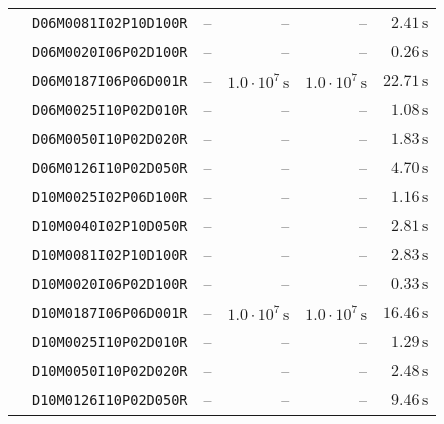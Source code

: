 \begin{tabular}{cc|rrrr}
 & \texttt{\footnotesize  D06M0081I02P10D100R} &                              -- &                              -- &                              -- & $             2.41\,\text{s}$\\
 & \texttt{\footnotesize  D06M0020I06P02D100R} &                              -- &                              -- &                              -- & $             0.26\,\text{s}$\\
 & \texttt{\footnotesize  D06M0187I06P06D001R} &                              -- & $  1.0\cdot 10^{7}\,\text{s}$ & $  1.0\cdot 10^{7}\,\text{s}$ & $            22.71\,\text{s}$\\
 & \texttt{\footnotesize  D06M0025I10P02D010R} &                              -- &                              -- &                              -- & $             1.08\,\text{s}$\\
 & \texttt{\footnotesize  D06M0050I10P02D020R} &                              -- &                              -- &                              -- & $             1.83\,\text{s}$\\
 & \texttt{\footnotesize  D06M0126I10P02D050R} &                              -- &                              -- &                              -- & $             4.70\,\text{s}$\\
 & \texttt{\footnotesize  D10M0025I02P06D100R} &                              -- &                              -- &                              -- & $             1.16\,\text{s}$\\
 & \texttt{\footnotesize  D10M0040I02P10D050R} &                              -- &                              -- &                              -- & $             2.81\,\text{s}$\\
 & \texttt{\footnotesize  D10M0081I02P10D100R} &                              -- &                              -- &                              -- & $             2.83\,\text{s}$\\
 & \texttt{\footnotesize  D10M0020I06P02D100R} &                              -- &                              -- &                              -- & $             0.33\,\text{s}$\\
 & \texttt{\footnotesize  D10M0187I06P06D001R} &                              -- & $  1.0\cdot 10^{7}\,\text{s}$ & $  1.0\cdot 10^{7}\,\text{s}$ & $            16.46\,\text{s}$\\
 & \texttt{\footnotesize  D10M0025I10P02D010R} &                              -- &                              -- &                              -- & $             1.29\,\text{s}$\\
 & \texttt{\footnotesize  D10M0050I10P02D020R} &                              -- &                              -- &                              -- & $             2.48\,\text{s}$\\
 & \texttt{\footnotesize  D10M0126I10P02D050R} &                              -- &                              -- &                              -- & $             9.46\,\text{s}$\\
\end{tabular}
